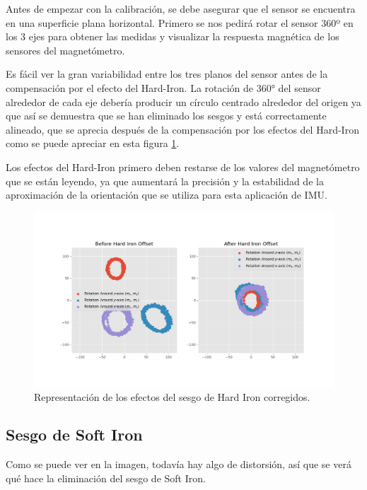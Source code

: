 Antes de empezar con la calibración, se debe asegurar que el sensor se encuentra en una superficie plana horizontal. Primero se nos pedirá rotar el sensor 360º en los 3 ejes para obtener las medidas y visualizar la respuesta magnética de los sensores del magnetómetro.

Es fácil ver la gran variabilidad entre los tres planos del sensor antes de la compensación por el efecto del Hard-Iron. La rotación de 360° del sensor alrededor de cada eje debería producir un círculo centrado alrededor del origen ya que así se demuestra que se han eliminado los sesgos y está correctamente alineado, que se aprecia después de la compensación por los efectos del Hard-Iron como se puede apreciar en esta figura \ref{fig:hardiron}.

Los efectos del Hard-Iron primero deben restarse de los valores del magnetómetro que se están leyendo, ya que aumentará la precisión y la estabilidad de la aproximación de la orientación que se utiliza para esta aplicación de IMU.

\begin{figure}[H]
  \centering
  \includegraphics[scale=0.6]{figs/hard_iron_calibration} %
  \caption{ Representación de los efectos del sesgo de Hard Iron corregidos.}
  \label{fig:hardiron}
\end{figure} 

\subsection{Sesgo de Soft Iron}
\label{subsec:soft_iron}

Como se puede ver en la imagen, todavía hay algo de distorsión, así que se verá qué hace la eliminación del sesgo de Soft Iron.

